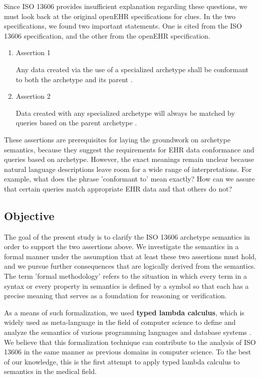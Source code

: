 \documentclass[preprint,3p,onecolumn,times,review]{article}
\begin{document}
Since ISO 13606 provides insufficient explanation regarding these questions, we must look back at the original openEHR specifications for clues.
In the two specifications, we found two important statements. One is cited from the ISO 13606 specification, and the other from the openEHR specification.

\begin{enumerate}
\item Assertion 1

  Any data created via the use of a specialized archetype shall be conformant to both the archetype and its parent \cite[viii]{iso08:13606_healt_elect_part2}.
\item Assertion 2

  Data created with any specialized archetype will always be matched by queries based on the parent archetype \cite[p.51]{beale08:_openeh_archit_overv}.
\end{enumerate}

These assertions are prerequisites for laying the groundwork on archetype semantics, because they suggest the requirements for EHR data conformance and queries based on archetype.
However, the exact meanings remain unclear because natural language descriptions leave room for a wide range of interpretations.
For example, what does the phrase 'conformant to' mean exactly? How can we assure that certain queries match appropriate EHR data and that others do not?

\subsection{Objective}


The goal of the present study is to clarify the ISO 13606 archetype semantics in order to support the two assertions above. We investigate the semantics in a formal manner under the assumption that at least these two assertions must hold, and we pursue further consequences that are logically derived from the semantics.
The term 'formal methodology' refers to the situation in which every term in a syntax or every property in semantics is defined by a symbol so that each has a precise meaning that serves as a foundation for reasoning or verification. 


As a means of such formalization, we used {\bf typed lambda calculus}, which is widely used as meta-language in the field of computer science to define and analyze the semantics of various programming languages and database systems \cite{ohori89:_simpl_seman_ml_polym,igarashi01:_feath_java}.
We believe that this formalization technique can contribute to the analysis of ISO 13606 in the same manner as previous domains in computer science.
To the best of our knowledge, this is the first attempt to apply typed lambda calculus to semantics in the medical field.
\end{document}
